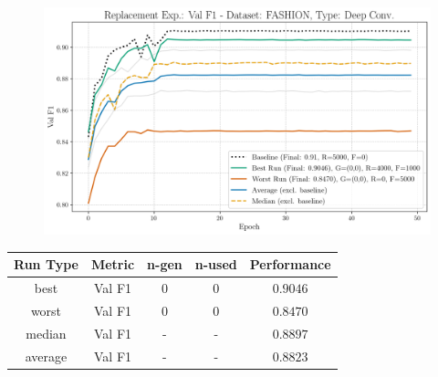 \begin{figure}[htbp]
	\centering
	\includegraphics[width=.85\textwidth]{abb/strat_classifier_performance/FASHION_STRATIFIED_CLASSIFIERS_VANILLA_GAN/replacement_experiments/val_f1_score_['VANILLA']_FASHION_all.png}
	\label{fig:app_strat_class_performance_replacement_exp._val_f1_score_}
\end{figure}
\begin{table}[H]
	\centering
	\vspace{-1em}
	\begin{tabular}{|c|c|c|c|c|}
		\hline
		Run Type & Metric & n-gen & n-used & Performance \\ \hline
		best & Val F1 & 0 & 0 & $0.9046$\\ \hline
		worst & Val F1 & 0 & 0 & $0.8470$\\ \hline
		median & Val F1 & - & - & $0.8897$\\ \hline
		average & Val F1 & - & - & $0.8823$
		\\ \hline
	\end{tabular}
\end{table}
\newpage
